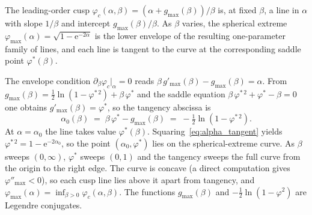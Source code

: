 \documentclass[letterpaper]{article} %
\newcommand{\e}{{\mathrm{e}}}
\newcommand{\Bnet}{\beta}
\begin{document}
The leading-order cusp $\varphi_c(\alpha, \Bnet) = (\alpha + g_{\max}(\Bnet))/\Bnet$ is, at fixed $\Bnet$, 
a line in $\alpha$ with slope $1/\Bnet$ and intercept $g_{\max}(\Bnet)/\Bnet$.  As $\Bnet$ varies, 
the spherical extreme $\varphi_{\max}(\alpha) =\sqrt{1-\e^{-2\alpha}}$ is the lower envelope of the 
resulting one-parameter family of lines, and each line is tangent to the curve at the corresponding 
saddle point $\varphi^*(\Bnet)$.

The envelope condition $\partial_\Bnet \varphi_c|_\alpha = 0$ reads 
$\Bnet\, g'_{\max}(\Bnet) - g_{\max}(\Bnet) = \alpha$.  From $g_{\max}(\Bnet) 
= \tfrac12 \ln(1 - \varphi^{*\,2}) + \Bnet\,\varphi^*$ and the saddle equation 
$\Bnet\,\varphi^{*\,2} + \varphi^* - \Bnet = 0$ one obtains $g'_{\max}(\Bnet) = \varphi^*$, 
so the tangency abscissa is
\begin{equation}
\alpha_0(\Bnet) \;=\; \Bnet\,\varphi^* - g_{\max}(\Bnet) \;=\; -\tfrac12 \ln(1 - \varphi^{*\,2}).
\label{eq:alpha_tangent}
\end{equation}
At $\alpha = \alpha_0$ the line takes value $\varphi^*(\Bnet)$.  Squaring~\eqref{eq:alpha_tangent} 
yields $\varphi^{*\,2} = 1 - \e^{-2\alpha_0}$, so the point $(\alpha_0, \varphi^*)$ lies on the 
spherical-extreme curve.  As $\Bnet$ sweeps $(0, \infty)$, $\varphi^*$ sweeps $(0,
1)$ and the tangency sweeps the full curve from the origin to the right edge.
The curve is concave (a direct computation gives $\varphi''_{\max} < 0$), so each 
cusp line lies above it apart from tangency, and $\varphi_{\max}(\alpha) = \inf_{\Bnet > 0} \varphi_c(\alpha,
\Bnet)$.  The functions $g_{\max}(\Bnet)$ and $-\tfrac12 \ln(1 - \varphi^2)$ are Legendre conjugates. 
\end{document}
